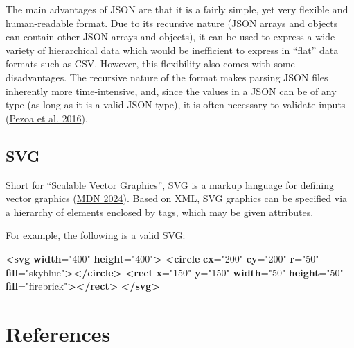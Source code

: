 \documentclass[
]{book}
\newenvironment{Shaded}{\begin{snugshade}}{\end{snugshade}}
\newcommand{\ErrorTok}[1]{\textcolor[rgb]{0.64,0.00,0.00}{\textbf{#1}}}
\newcommand{\KeywordTok}[1]{\textcolor[rgb]{0.13,0.29,0.53}{\textbf{#1}}}
\newcommand{\OtherTok}[1]{\textcolor[rgb]{0.56,0.35,0.01}{#1}}
\newcommand{\StringTok}[1]{\textcolor[rgb]{0.31,0.60,0.02}{#1}}
\begin{document}
The main advantages of JSON are that it is a fairly simple, yet very flexible and human-readable format. Due to its recursive nature (JSON arrays and objects can contain other JSON arrays and objects), it can be used to express a wide variety of hierarchical data which would be inefficient to express in ``flat'' data formats such as CSV. However, this flexibility also comes with some disadvantages. The recursive nature of the format makes parsing JSON files inherently more time-intensive, and, since the values in a JSON can be of any type (as long as it is a valid JSON type), it is often necessary to validate inputs (\protect\hyperlink{ref-pezoa2016}{Pezoa et al. 2016}).

\hypertarget{svg}{%
\section{SVG}\label{svg}}

Short for ``Scalable Vector Graphics'', SVG is a markup language for defining vector graphics (\protect\hyperlink{ref-mdn2024b}{MDN 2024}). Based on XML, SVG graphics can be specified via a hierarchy of elements enclosed by tags, which may be given attributes.

For example, the following is a valid SVG:

\begin{Shaded}
\begin{Highlighting}[]
\KeywordTok{\textless{}svg} \ErrorTok{width}\OtherTok{=}\StringTok{"400"} \ErrorTok{height}\OtherTok{=}\StringTok{"400"}\KeywordTok{\textgreater{}}
  \KeywordTok{\textless{}circle} \ErrorTok{cx}\OtherTok{=}\StringTok{"200"} \ErrorTok{cy}\OtherTok{=}\StringTok{"200"} \ErrorTok{r}\OtherTok{=}\StringTok{"50"} \ErrorTok{fill}\OtherTok{=}\StringTok{"skyblue"}\KeywordTok{\textgreater{}\textless{}/circle\textgreater{}}
  \KeywordTok{\textless{}rect} \ErrorTok{x}\OtherTok{=}\StringTok{"150"} \ErrorTok{y}\OtherTok{=}\StringTok{"150"} \ErrorTok{width}\OtherTok{=}\StringTok{"50"} \ErrorTok{height}\OtherTok{=}\StringTok{"50"} \ErrorTok{fill}\OtherTok{=}\StringTok{"firebrick"}\KeywordTok{\textgreater{}\textless{}/rect\textgreater{}}
\KeywordTok{\textless{}/svg\textgreater{}}
\end{Highlighting}
\end{Shaded}

\hypertarget{references}{%
\chapter{References}\label{references}}
\end{document}
